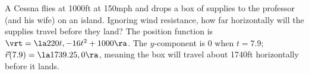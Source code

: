 {A Cessna flies at 1000ft at 150mph and drops a box of supplies to the professor (and his wife) on an island. Ignoring wind resistance, how far horizontally will the supplies travel before they land? 
}
{The position function is $\vrt = \la 220t,-16t^2+1000\ra$. The $y$-component is 0 when $t=7.9$; $\vec r(7.9) = \la 1739.25,0\ra$, meaning the box will travel about 1740ft horizontally before it lands.
}
